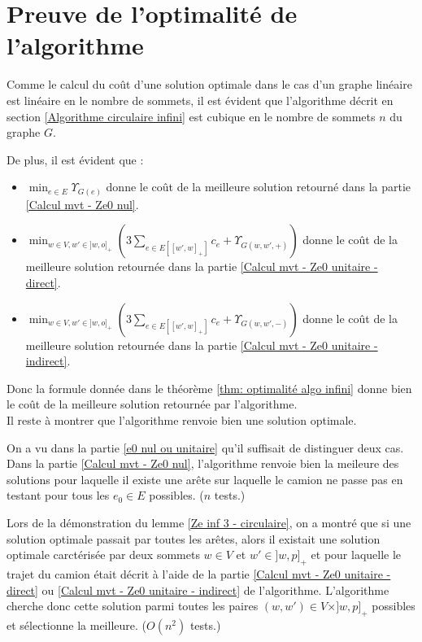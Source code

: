 \section{Preuve de l'optimalité de l'algorithme}

Comme le calcul du coût d'une solution optimale dans le cas d'un graphe linéaire est linéaire en le nombre de sommets, il est évident que l'algorithme décrit en section \ref{Algorithme circulaire infini} est cubique en le nombre de sommets $n$ du graphe $G$.

De plus, il est évident que :
\begin{itemize}
\item $\min_{e \in E} \Upsilon_{G(e)}$ donne le coût de la meilleure solution retourné dans la partie \ref{Calcul mvt - Ze0 nul}.
\item $\min_{w \in V, w' \in ]w,o]_+} \left(3 \sum_{ e \in E\left[ \left[w',w\right]_+ \right] }c_e + \Upsilon_{G(w,w',+)}\right)$ donne le coût de la meilleure solution retournée dans la partie \ref{Calcul mvt - Ze0 unitaire - direct}.
\item $\min_{w \in V, w' \in ]w,o]_+} \left(3 \sum_{ e \in E\left[ \left[w',w\right]_+ \right] }c_e + \Upsilon_{G(w,w',-)}\right)$ donne le coût de la meilleure solution retournée dans la partie \ref{Calcul mvt - Ze0 unitaire - indirect}.
\end{itemize}
Donc la formule donnée dans le théorème \ref{thm: optimalité algo infini} donne bien le coût de la meilleure solution retournée par l'algorithme.
\\

Il reste à montrer que l'algorithme renvoie bien une solution optimale.

On a vu dans la partie \ref{e0 nul ou unitaire} qu'il suffisait de distinguer deux cas. Dans la partie \ref{Calcul mvt - Ze0 nul}, l'algorithme renvoie bien la meileure des solutions pour laquelle il existe une arête sur laquelle le camion ne passe pas en testant pour tous les $e_0 \in E$ possibles. ($n$ tests.)

Lors de la démonstration du lemme \ref{Ze inf 3 - circulaire}, on a montré que si une solution optimale passait par toutes les arêtes, alors il existait une solution optimale carctérisée par deux sommets $w \in V$ et $w' \in ]w,p]_+$ et pour laquelle le trajet du camion était décrit à l'aide de la partie \ref{Calcul mvt - Ze0 unitaire - direct} ou \ref{Calcul mvt - Ze0 unitaire - indirect} de l'algorithme. L'algorithme cherche donc cette solution parmi toutes les paires $(w,w') \in V\times ]w,p]_+$ possibles et sélectionne la meilleure. ($O(n^2)$ tests.)

